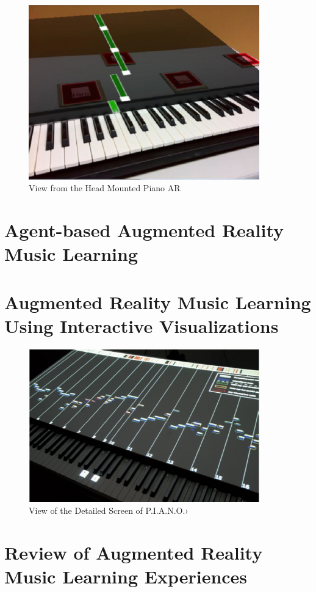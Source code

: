 \documentclass{article}
\begin{document}
\begin{figure}
    \centering
    \includegraphics[width=10cm]{figures/headmountedview.png}
    \caption{View from the Head Mounted Piano AR  }
    \label{fig:View from the HeadMounted}
\end{figure}


\section{Agent-based Augmented Reality Music Learning}


\section{Augmented Reality Music Learning Using Interactive Visualizations}

\begin{figure}
    \centering
    \includegraphics[width=10cm]{figures/piano}
    \caption{View of the Detailed Screen of P.I.A.N.O.› }
    \label{fig:View from the HeadMounted}
\end{figure}



\section{Review of Augmented Reality Music Learning Experiences}
\end{document}
